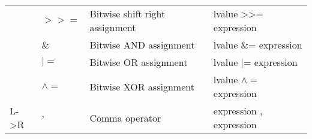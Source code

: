 \documentclass[../../LearnCpp.tex]{subfiles}
\begin{document}
\begin{center}
\begin{tiny}
\begin{tabularx}{ 1\textwidth}{
        | >{\raggedright\arraybackslash}X
        | >{\raggedright\arraybackslash}X
        | >{\raggedright\arraybackslash}X
        | >{\raggedright\arraybackslash}X |
      }
                                  & $>>=$               & Bitwise shift right assignment    & lvalue >>= expression                 \\
                                  & $\&$                & Bitwise AND assignment            & lvalue \&= expression                 \\
                                  & $|=$                & Bitwise OR assignment             & lvalue |= expression                  \\
                                  & $\wedge=$           & Bitwise XOR assignment            & lvalue $\wedge=$ expression           \\
      \hline
      17 L->R                     & $,$                 & Comma operator                    & expression , expression               \\
      \hline
    \end{tabularx}
  \end{tiny}
\end{center}
\end{document}
